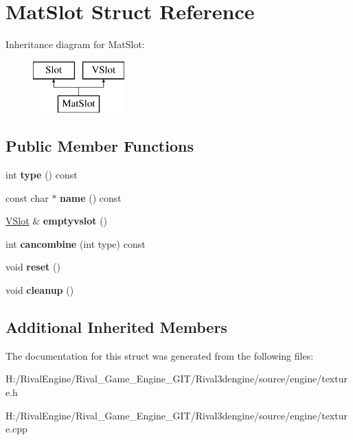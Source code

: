 \hypertarget{struct_mat_slot}{}\section{Mat\+Slot Struct Reference}
\label{struct_mat_slot}
Inheritance diagram for Mat\+Slot\+:\begin{figure}[H]
\begin{center}
\leavevmode
\includegraphics[height=2.000000cm]{struct_mat_slot}
\end{center}
\end{figure}
\subsection*{Public Member Functions}
\begin{DoxyCompactItemize}
\item 
\mbox{\label{struct_mat_slot_a25399e643d0d7ec03bf76d7471d37188}} 
int {\bfseries type} () const
\item 
\mbox{\label{struct_mat_slot_a775bc4d3225428ccb30d2294145d8041}} 
const char $\ast$ {\bfseries name} () const
\item 
\mbox{\label{struct_mat_slot_a9cc80805e6d4469fc74c0bc658527d6a}} 
\hyperlink{struct_v_slot}{V\+Slot} \& {\bfseries emptyvslot} ()
\item 
\mbox{\label{struct_mat_slot_a2f397819dc1b75b64d012e70c85ca245}} 
int {\bfseries cancombine} (int type) const
\item 
\mbox{\label{struct_mat_slot_a8ec68f95635261a7233dc6de209fc945}} 
void {\bfseries reset} ()
\item 
\mbox{\label{struct_mat_slot_ada91985096112deb59e192780cc029c4}} 
void {\bfseries cleanup} ()
\end{DoxyCompactItemize}
\subsection*{Additional Inherited Members}


The documentation for this struct was generated from the following files\+:\begin{DoxyCompactItemize}
\item 
H\+:/\+Rival\+Engine/\+Rival\+\_\+\+Game\+\_\+\+Engine\+\_\+\+G\+I\+T/\+Rival3dengine/source/engine/texture.\+h\item 
H\+:/\+Rival\+Engine/\+Rival\+\_\+\+Game\+\_\+\+Engine\+\_\+\+G\+I\+T/\+Rival3dengine/source/engine/texture.\+cpp\end{DoxyCompactItemize}
